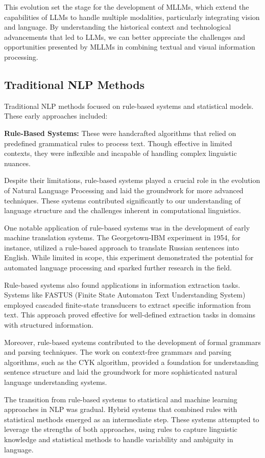 This evolution set the stage for the development of MLLMs, which extend the capabilities of LLMs to handle multiple modalities, particularly integrating vision and language. By understanding the historical context and technological advancements that led to LLMs, we can better appreciate the challenges and opportunities presented by MLLMs in combining textual and visual information processing.

\subsection{Traditional NLP Methods}
Traditional NLP methods focused on rule-based systems and statistical models. These early approaches included:

\textbf{Rule-Based Systems:} These were handcrafted algorithms that relied on predefined grammatical rules to process text. Though effective in limited contexts, they were inflexible and incapable of handling complex linguistic nuances.

Despite their limitations, rule-based systems played a crucial role in the evolution of Natural Language Processing and laid the groundwork for more advanced techniques. These systems contributed significantly to our understanding of language structure and the challenges inherent in computational linguistics.

One notable application of rule-based systems was in the development of early machine translation systems. The Georgetown-IBM experiment in 1954, for instance, utilized a rule-based approach to translate Russian sentences into English. While limited in scope, this experiment demonstrated the potential for automated language processing and sparked further research in the field.

Rule-based systems also found applications in information extraction tasks. Systems like FASTUS (Finite State Automaton Text Understanding System) employed cascaded finite-state transducers to extract specific information from text. This approach proved effective for well-defined extraction tasks in domains with structured information.

Moreover, rule-based systems contributed to the development of formal grammars and parsing techniques. The work on context-free grammars and parsing algorithms, such as the CYK algorithm, provided a foundation for understanding sentence structure and laid the groundwork for more sophisticated natural language understanding systems.

The transition from rule-based systems to statistical and machine learning approaches in NLP was gradual. Hybrid systems that combined rules with statistical methods emerged as an intermediate step. These systems attempted to leverage the strengths of both approaches, using rules to capture linguistic knowledge and statistical methods to handle variability and ambiguity in language.

